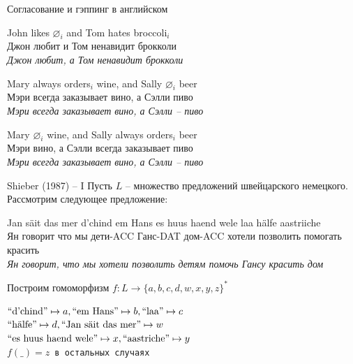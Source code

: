 \documentclass{beamer}
\begin{document}
\begin{frame}{Согласование и гэппинг в английском}
\begin{scriptsize}
\begin{exe}
	\ex 
		\gll John likes $\varnothing_i$ and Tom hates broccoli$_i$ \\
             Джон любит {} и Том ненавидит брокколи\\
		\glt \textit{Джон любит, а Том ненавидит брокколи}
\end{exe}	
\begin{exe}
	\ex 
		\gll Mary always orders$_i$ wine, and Sally $\varnothing_i$ beer \\
             Мэри всегда заказывает вино, а Сэлли {} пиво \\
		\glt \textit{Мэри всегда заказывает вино, а Сэлли -- пиво}
\end{exe}
\begin{exe}
	\ex 
		\gll *Mary $\varnothing_i$ wine, and Sally always orders$_i$ beer \\
             Мэри {} вино, а Сэлли всегда заказывает пиво \\
		\glt \textit{Мэри всегда заказывает вино, а Сэлли -- пиво}
\end{exe}
\end{scriptsize}
\end{frame}



\begin{frame}{Shieber (1987) -- I}
Пусть $L$ -- множество предложений швейцарского немецкого. Рассмотрим следующее предложение:\\ 
\begin{scriptsize}
\begin{exe}
	\ex 
		\gll Jan s\"{a}it das mer d'chind {em Hans} {es huus} {haend wele} laa h\"{a}lfe aastriiche \\
             Ян говорит что мы дети-ACC Ганс-DAT дом-ACC хотели позволить помогать красить \\
		\glt \textit{Ян говорит, что мы хотели позволить детям помочь Гансу красить дом}
\end{exe}
\end{scriptsize}
\bigskip

Построим гомоморфизм $f : L \to \{a, b, c, d, w, x, y, z\}^*$\\
\begin{center}
\begin{footnotesize}
\texttt{$\textnormal{``d'chind''} \mapsto a, \textnormal{``em Hans''} \mapsto b, \textnormal{``laa''} \mapsto c$\\
$\textnormal{``h\"{a}lfe''} \mapsto d, \textnormal{``Jan s\"{a}it das mer''} \mapsto w$\\
$\textnormal{``es huus haend wele''} \mapsto x, \textnormal{``aastriche''} \mapsto y$\\
$f(\_) = z$ в остальных случаях}
\end{footnotesize}
\end{center}
\end{frame}
\end{document}

